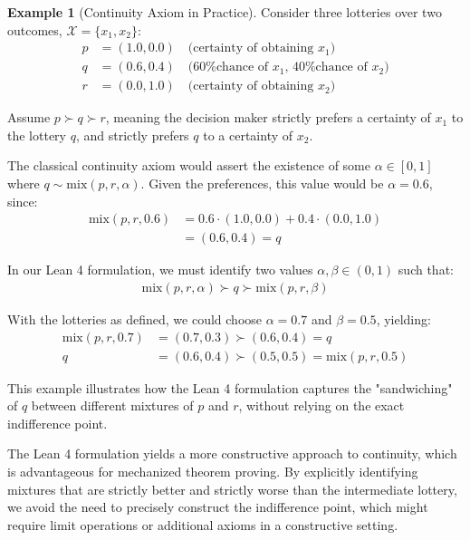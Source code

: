 \documentclass{article}
\theoremstyle{definition}
\newtheorem{example}{Example}[section]
\newcommand{\X}{\mathcal{X}}
\newcommand{\strictpref}{\succ} %
\newcommand{\indiff}{\sim} %
\newcommand{\mix}{\mathrm{mix}} %
\begin{document}
\begin{example}[Continuity Axiom in Practice]
Consider three lotteries over two outcomes, $\X = \{x_1, x_2\}$:
\begin{align*}
p &= (1.0, 0.0) \quad \text{(certainty of obtaining $x_1$)} \\
q &= (0.6, 0.4) \quad \text{(60\% chance of $x_1$, 40\% chance of $x_2$)} \\
r &= (0.0, 1.0) \quad \text{(certainty of obtaining $x_2$)}
\end{align*}

Assume $p \strictpref q \strictpref r$, meaning the decision maker strictly prefers a certainty of $x_1$ to the lottery $q$, and strictly prefers $q$ to a certainty of $x_2$.

The classical continuity axiom would assert the existence of some $\alpha \in [0,1]$ where $q \indiff \mix(p, r, \alpha)$. Given the preferences, this value would be $\alpha = 0.6$, since:
\begin{align*}
\mix(p, r, 0.6) &= 0.6 \cdot (1.0, 0.0) + 0.4 \cdot (0.0, 1.0) \\
&= (0.6, 0.4) = q
\end{align*}

In our Lean 4 formulation, we must identify two values $\alpha, \beta \in (0,1)$ such that:
\begin{align*}
\mix(p, r, \alpha) \strictpref q \strictpref \mix(p, r, \beta)
\end{align*}

With the lotteries as defined, we could choose $\alpha = 0.7$ and $\beta = 0.5$, yielding:
\begin{align*}
\mix(p, r, 0.7) &= (0.7, 0.3) \strictpref (0.6, 0.4) = q \\
q &= (0.6, 0.4) \strictpref (0.5, 0.5) = \mix(p, r, 0.5)
\end{align*}

This example illustrates how the Lean 4 formulation captures the "sandwiching" of $q$ between different mixtures of $p$ and $r$, without relying on the exact indifference point.
\end{example}

The Lean 4 formulation yields a more constructive approach to continuity, which is advantageous for mechanized theorem proving. By explicitly identifying mixtures that are strictly better and strictly worse than the intermediate lottery, we avoid the need to precisely construct the indifference point, which might require limit operations or additional axioms in a constructive setting.
\end{document}
